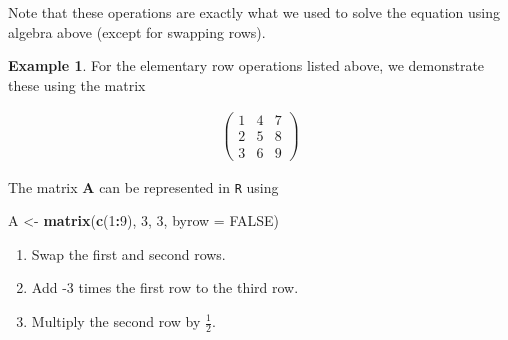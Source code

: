 \documentclass[
]{book}
\newenvironment{Shaded}{\begin{snugshade}}{\end{snugshade}}
\newcommand{\DataTypeTok}[1]{\textcolor[rgb]{0.13,0.29,0.53}{#1}}
\newcommand{\DecValTok}[1]{\textcolor[rgb]{0.00,0.00,0.81}{#1}}
\newcommand{\KeywordTok}[1]{\textcolor[rgb]{0.13,0.29,0.53}{\textbf{#1}}}
\newcommand{\NormalTok}[1]{#1}
\newcommand{\OperatorTok}[1]{\textcolor[rgb]{0.81,0.36,0.00}{\textbf{#1}}}
\newcommand{\OtherTok}[1]{\textcolor[rgb]{0.56,0.35,0.01}{#1}}
\newcommand{\StringTok}[1]{\textcolor[rgb]{0.31,0.60,0.02}{#1}}
\theoremstyle{definition}
\theoremstyle{definition}
\newtheorem{example}{Example}[chapter]
\theoremstyle{definition}
\theoremstyle{definition}
\theoremstyle{remark}
\begin{document}
Note that these operations are exactly what we used to solve the equation using algebra above (except for swapping rows).

\begin{example}

For the elementary row operations listed above, we demonstrate these using the matrix

\[
\begin{aligned}
\begin{pmatrix} 1 & 4 & 7 \\ 2 & 5 & 8 \\ 3 & 6 & 9 \end{pmatrix}
\end{aligned}
\]

The matrix \(\mathbf{A}\) can be represented in \texttt{R} using

\begin{Shaded}
\begin{Highlighting}[]
\NormalTok{A <-}\StringTok{ }\KeywordTok{matrix}\NormalTok{(}\KeywordTok{c}\NormalTok{(}\DecValTok{1}\OperatorTok{:}\DecValTok{9}\NormalTok{), }\DecValTok{3}\NormalTok{, }\DecValTok{3}\NormalTok{, }\DataTypeTok{byrow =} \OtherTok{FALSE}\NormalTok{)}
\end{Highlighting}
\end{Shaded}

\begin{enumerate}
\def\labelenumi{\arabic{enumi})}
\item
  Swap the first and second rows.
\item
  Add -3 times the first row to the third row.
\item
  Multiply the second row by \(\frac{1}{2}\).
\end{enumerate}

\end{example}
\end{document}

